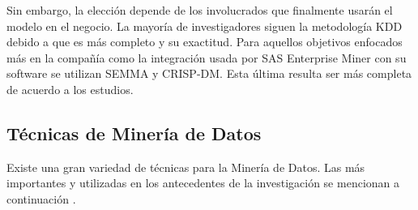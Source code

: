 Sin embargo, la elección depende de los involucrados que finalmente usarán el modelo en el negocio. La mayoría de investigadores siguen la metodología KDD debido a que es más completo y su exactitud. Para aquellos objetivos enfocados más en la compañía como la integración usada por SAS Enterprise Miner con su software se utilizan SEMMA y CRISP-DM. Esta última resulta ser más completa de acuerdo a los estudios.

\clearpage

\subsection{Técnicas de Minería de Datos}

Existe una gran variedad de técnicas para la Minería de Datos. Las más importantes y utilizadas en los antecedentes de la investigación se mencionan a continuación \parencite{gl_microsoft2018datamining}.

